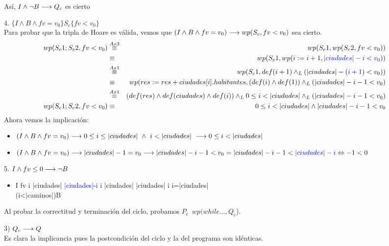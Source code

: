 \documentclass[10pt,a4paper,fleqn]{article}
\begin{document}
Así, $I \land \neg B \longrightarrow Q_c$ es cierto\\
\item 4. $\{I \land B \land fv=v_0\}S_c\{fv<v_0\}$\\Para probar que la tripla de Hoare es válida, vemos que $(I \land B \land fv=v_0) \longrightarrow wp(S_c,fv<v_0)$ sea cierto.\\
\begin{eqnarray}
    wp(S_c1;S_c2, fv<v_0) &\overset{Ax3}{\equiv}& wp(S_c1, wp(S_c2, fv<v_0)) \notag \\
     &\equiv&  wp(S_c1, wp(i:= i+1, \textcolor{blue}{|ciudades|-i < v_0}))\notag \\
    &\overset{Ax1}{\equiv}& wp(S_c1, def(i+1) \land _L (|ciudades|- (\textcolor{blue}{i+1}) < v_0)) \notag \\
    &\equiv& wp(res:= res + ciudades[i].habitantes, (def(i) \land def(1)) \land _L (|ciudades| -i - 1 < v_0)\notag \\
    &\overset{Ax1}{\equiv}& (def(res) \land def(ciudades) \land def(i))\land _L 0 \leq i < |ciudades| \land _L (|ciudades| -i -1 < v_0) \notag \\
    wp(S_c1;S_c2, fv<v_0) &\equiv& 0 \leq i < |ciudades| \land |ciudades| -i -1 < v_0 \notag 
\end{eqnarray}
Ahora vemos la implicación: \\
\begin{itemize}
    \item \parbox[t]{\textwidth}{$(I \land B \land fv=v_0) \longrightarrow 0 \leq i \leq |ciudades| \ \land \ i < |ciudades|\ \longrightarrow 0 \leq i < |ciudades| $}
    \item \parbox[t]{\textwidth}{$(I \land B \land fv=v_0) \longrightarrow |ciudades|-1=v_0 \longrightarrow |ciudades| -i -1 < v_0 = |ciudades| -i -1 < \textcolor{blue}{|ciudades| -i} \Leftrightarrow -1<0$}
\end{itemize}
\item 5. $I \land fv\leq 0 \longrightarrow \neg B$
\begin{itemize}
    \item \parbox[t]{\textwidth}{I \land fv \leq i \leq |ciudades| \land \textcolor{blue}{|ciudades|-i}  \leq i \leq|ciudades| \land |ciudades| \leq i \implica i=|ciudades|\\ \implica \neg(i<|caminos|)\equiv\neg B}
\end{itemize}

Al probar la correctitud y terminación del ciclo, probamos $P_c$\implica \ $wp(while...,Q_c$).\\
\item 3) $Q_c \longrightarrow Q$\\
Es clara la implicancia pues la postcondición del ciclo y la del programa son idénticas.
\end{document}
